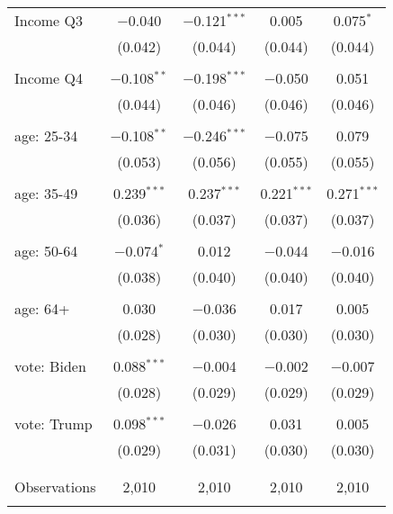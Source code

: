 \begin{tabular}{@{\extracolsep{5pt}}lcccc}
 Income Q3 & $-$0.040 & $-$0.121$^{***}$ & 0.005 & 0.075$^{*}$ \\ 
  & (0.042) & (0.044) & (0.044) & (0.044) \\ 
  & & & & \\ 
 Income Q4 & $-$0.108$^{**}$ & $-$0.198$^{***}$ & $-$0.050 & 0.051 \\ 
  & (0.044) & (0.046) & (0.046) & (0.046) \\ 
  & & & & \\ 
 age: 25-34 & $-$0.108$^{**}$ & $-$0.246$^{***}$ & $-$0.075 & 0.079 \\ 
  & (0.053) & (0.056) & (0.055) & (0.055) \\ 
  & & & & \\ 
 age: 35-49 & 0.239$^{***}$ & 0.237$^{***}$ & 0.221$^{***}$ & 0.271$^{***}$ \\ 
  & (0.036) & (0.037) & (0.037) & (0.037) \\ 
  & & & & \\ 
 age: 50-64 & $-$0.074$^{*}$ & 0.012 & $-$0.044 & $-$0.016 \\ 
  & (0.038) & (0.040) & (0.040) & (0.040) \\ 
  & & & & \\ 
 age: 64+ & 0.030 & $-$0.036 & 0.017 & 0.005 \\ 
  & (0.028) & (0.030) & (0.030) & (0.030) \\ 
  & & & & \\ 
 vote: Biden & 0.088$^{***}$ & $-$0.004 & $-$0.002 & $-$0.007 \\ 
  & (0.028) & (0.029) & (0.029) & (0.029) \\ 
  & & & & \\ 
 vote: Trump & 0.098$^{***}$ & $-$0.026 & 0.031 & 0.005 \\ 
  & (0.029) & (0.031) & (0.030) & (0.030) \\ 
  & & & & \\ 
\hline \\[-1.8ex] 

Observations & 2,010 & 2,010 & 2,010 & 2,010 \\ 
\hline 
\hline \\[-1.8ex] 
\end{tabular} 